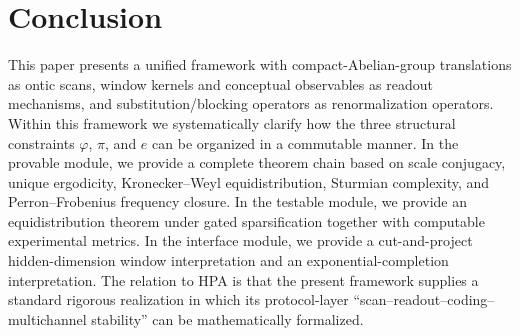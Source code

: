 ﻿\section{Conclusion}

This paper presents a unified framework with compact-Abelian-group translations as ontic scans, window kernels and conceptual observables as readout mechanisms, and substitution/blocking operators as renormalization operators. Within this framework we systematically clarify how the three structural constraints $\varphi$, $\pi$, and $e$ can be organized in a commutable manner. In the provable module, we provide a complete theorem chain based on scale conjugacy, unique ergodicity, Kronecker--Weyl equidistribution, Sturmian complexity, and Perron--Frobenius frequency closure. In the testable module, we provide an equidistribution theorem under gated sparsification together with computable experimental metrics. In the interface module, we provide a cut-and-project hidden-dimension window interpretation and an exponential-completion interpretation. The relation to HPA is that the present framework supplies a standard rigorous realization in which its protocol-layer ``scan--readout--coding--multichannel stability'' can be mathematically formalized.
